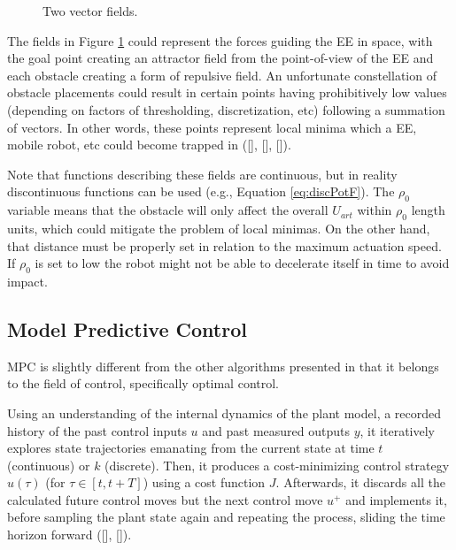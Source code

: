 \begin{figure}[!h]
	\begin{minipage}[t]{4 cm}
		
	\end{minipage}
	\hspace{2.5cm}
	\begin{minipage}[t]{4 cm}
		
	\end{minipage}
	\caption{Two vector fields.} 
	\label{fig:apf_maxmin_ex}
\end{figure}

The fields in Figure \ref{fig:apf_maxmin_ex} could represent the forces guiding the \gls{EE} in space, with the goal point creating an attractor field from the point-of-view of the \gls{EE} and each obstacle creating a form of repulsive field. An unfortunate constellation of obstacle placements could result in certain points having prohibitively low values (depending on factors of thresholding, discretization, etc) following a summation of vectors. In other words, these points represent local minima which a \gls{EE}, mobile robot, etc could become trapped in ([\citeauthor{Lahouar2006}], [\citeauthor{Lindemann2005}], [\citeauthor{Tahir2018}]).

Note that functions describing these fields are continuous, but in reality discontinuous functions can be used (e.g., Equation \ref{eq:discPotF}). The $\rho_0$ variable means that the obstacle will only affect the overall $U_{art}$ within $\rho_0$ length units, which could mitigate the problem of local minimas. On the other hand, that distance must be properly set in relation to the maximum actuation speed. If $\rho_0$ is set to low the robot might not be able to decelerate itself in time to avoid impact.

\subsection{Model Predictive Control}

\gls{MPC} is slightly different from the other algorithms presented in that it belongs to the field of control, specifically optimal control.

Using an understanding of the internal dynamics of the plant model, a recorded history of the past control inputs $u$ and past measured outputs $y$, it iteratively explores state trajectories emanating from the current state at time $t$ (continuous) or $k$ (discrete). Then, it produces a cost-minimizing control strategy $u(\tau)$ (for $\tau \in [t, t + T]$) using a cost function $J$. Afterwards, it discards all the calculated future control moves but the next control move $u^+$ and implements it, before sampling the plant state again and repeating the process, sliding the time horizon forward ([\citeauthor{Hoy2012}], [\citeauthor{Wang2009a}]).

